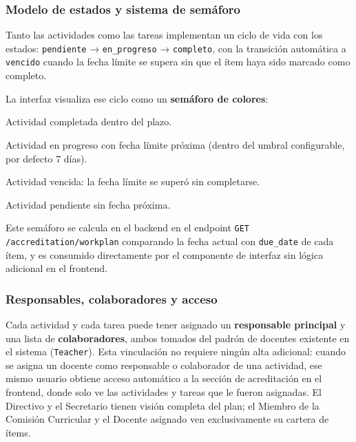 \subsubsection*{Modelo de estados y sistema de semáforo}

Tanto las actividades como las tareas implementan un ciclo de vida
con los estados:
\texttt{pendiente} → \texttt{en\_progreso} → \texttt{completo},
con la transición automática a \texttt{vencido} cuando la fecha límite
se supera sin que el ítem haya sido marcado como completo.

La interfaz visualiza ese ciclo como un \textbf{semáforo de colores}:

\begin{description}[noitemsep, leftmargin=2.0cm, labelwidth=1.8cm]
  \item[\textcolor{green!60!black}{\textbf{Verde}}]
    Actividad completada dentro del plazo.
  \item[\textcolor{orange!80!black}{\textbf{Naranja}}]
    Actividad en progreso con fecha límite próxima
    (dentro del umbral configurable, por defecto 7 días).
  \item[\textcolor{red!70!black}{\textbf{Rojo}}]
    Actividad vencida: la fecha límite se superó sin completarse.
  \item[\textcolor{gray}{\textbf{Gris}}]
    Actividad pendiente sin fecha próxima.
\end{description}

Este semáforo se calcula en el backend en el endpoint
\texttt{GET /accreditation/workplan} comparando la fecha actual con
\texttt{due\_date} de cada ítem, y es consumido directamente por el
componente de interfaz sin lógica adicional en el frontend.

\subsubsection*{Responsables, colaboradores y acceso}

Cada actividad y cada tarea puede tener asignado un \textbf{responsable
principal} y una lista de \textbf{colaboradores}, ambos tomados del
padrón de docentes existente en el sistema (\texttt{Teacher}).
Esta vinculación no requiere ningún alta adicional: cuando se asigna
un docente como responsable o colaborador de una actividad, ese mismo
usuario obtiene acceso automático a la sección de acreditación
en el frontend, donde solo ve las actividades y tareas que le fueron
asignadas.
El Directivo y el Secretario tienen visión completa del plan; el
Miembro de la Comisión Curricular y el Docente asignado ven
exclusivamente su cartera de ítems.

